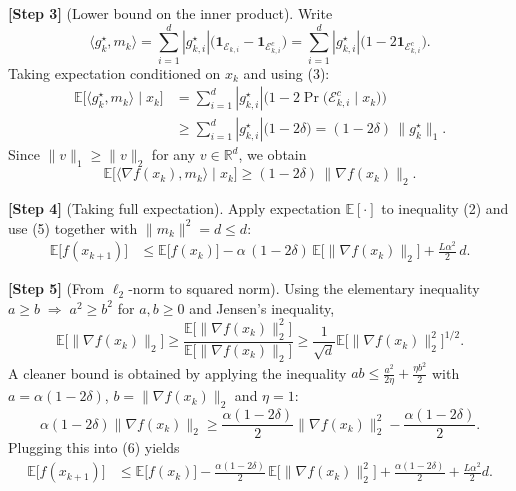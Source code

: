 \documentclass[11pt]{article}
\newcommand{\E}{\mathbb{E}}
\newcommand{\R}{\mathbb{R}}
\begin{document}
\noindent\textbf{[Step 3]} (Lower bound on the inner product).  
Write
\[
    \langle g^{\star}_{k},m_{k}\rangle
    =\sum_{i=1}^{d}|g^{\star}_{k,i}|
       \big(\mathbf{1}_{\mathcal{E}_{k,i}}-\mathbf{1}_{\mathcal{E}_{k,i}^{c}}\big)
    =\sum_{i=1}^{d}|g^{\star}_{k,i}|\big(1-2\mathbf{1}_{\mathcal{E}_{k,i}^{c}}\big).
\]
Taking expectation conditioned on $x_{k}$ and using (3):
\[
\begin{aligned}
    \E\!\big[\langle g^{\star}_{k},m_{k}\rangle\mid x_{k}\big]
    &=\sum_{i=1}^{d}|g^{\star}_{k,i}|
      \Big(1-2\Pr\big(\mathcal{E}_{k,i}^{c}\mid x_{k}\big)\Big)   \\
    &\ge\sum_{i=1}^{d}|g^{\star}_{k,i}|\big(1-2\delta\big)     
      = (1-2\delta)\,\|g^{\star}_{k}\|_{1}.
\end{aligned}
\tag{4}
\]
Since $\|v\|_{1}\ge\|v\|_{2}$ for any $v\in\R^{d}$, we obtain
\[
    \E\!\big[\langle\nabla f(x_{k}),m_{k}\rangle\mid x_{k}\big]
    \ge (1-2\delta)\,\|\nabla f(x_{k})\|_{2}.
\tag{5}
\]

\noindent\textbf{[Step 4]} (Taking full expectation).  
Apply expectation $\E[\cdot]$ to inequality (2) and use (5) together with $\|m_{k}\|^{2}=d\le d$:
\[
\begin{aligned}
    \E\!\big[f(x_{k+1})\big]
    &\le \E\!\big[f(x_{k})\big]
        -\alpha\,(1-2\delta)\,\E\!\big[\|\nabla f(x_{k})\|_{2}\big]
        +\frac{L\alpha^{2}}{2}\,d .
\end{aligned}
\tag{6}
\]

\noindent\textbf{[Step 5]} (From $\ell_{2}$‑norm to squared norm).  
Using the elementary inequality $a\ge b \;\Longrightarrow\; a^{2}\ge b^{2}$ for $a,b\ge0$ and Jensen’s inequality,
\[
    \E\!\big[\|\nabla f(x_{k})\|_{2}\big]\ge
    \frac{\E\!\big[\|\nabla f(x_{k})\|_{2}^{2}\big]}{\E\!\big[\|\nabla f(x_{k})\|_{2}\big]}
    \ge \frac{1}{\sqrt{d}}\E\!\big[\|\nabla f(x_{k})\|_{2}^{2}\big]^{1/2}.
\]
A cleaner bound is obtained by applying the inequality $ab\le \frac{a^{2}}{2\eta}+\frac{\eta b^{2}}{2}$ with $a=\alpha(1-2\delta)$, $b=\|\nabla f(x_{k})\|_{2}$ and $\eta=1$:
\[
    \alpha(1-2\delta)\|\nabla f(x_{k})\|_{2}
    \ge \frac{\alpha(1-2\delta)}{2}\|\nabla f(x_{k})\|_{2}^{2}
      -\frac{\alpha(1-2\delta)}{2}.
\]
Plugging this into (6) yields
\[
\begin{aligned}
    \E\!\big[f(x_{k+1})\big]
    &\le \E\!\big[f(x_{k})\big]
       -\frac{\alpha(1-2\delta)}{2}\,\E\!\big[\|\nabla f(x_{k})\|_{2}^{2}\big]
       +\frac{\alpha(1-2\delta)}{2}
       +\frac{L\alpha^{2}}{2}d .
\end{aligned}
\tag{7}
\]
\end{document}

